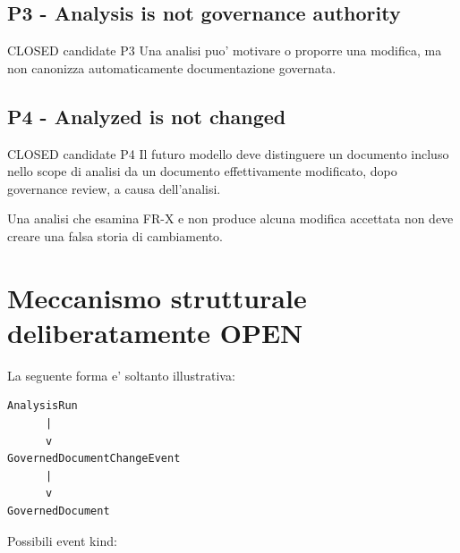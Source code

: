 \documentclass[11pt,a4paper]{article}
\begin{document}
\subsection{P3 - Analysis is not governance authority}

\begin{resultbox}{CLOSED candidate P3}
Una analisi puo' motivare o proporre una modifica, ma non canonizza automaticamente documentazione governata.
\end{resultbox}

\begin{center}
\end{center}

\subsection{P4 - Analyzed is not changed}

\begin{resultbox}{CLOSED candidate P4}
Il futuro modello deve distinguere un documento incluso nello scope di analisi da un documento effettivamente modificato, dopo governance review, a causa dell'analisi.
\end{resultbox}

Una analisi che esamina FR-X e non produce alcuna modifica accettata non deve creare una falsa storia di cambiamento.

\section{Meccanismo strutturale deliberatamente OPEN}

La seguente forma e' soltanto illustrativa:

\begin{lstlisting}
AnalysisRun
      |
      v
GovernedDocumentChangeEvent
      |
      v
GovernedDocument
\end{lstlisting}

Possibili event kind:
\end{document}
